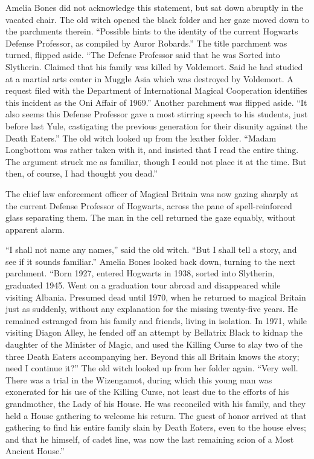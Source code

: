 Amelia Bones did not acknowledge this statement, but sat down abruptly
in the vacated chair. The old witch opened the black folder and her gaze
moved down to the parchments therein. ``Possible hints to the identity
of the current Hogwarts Defense Professor, as compiled by Auror
Robards.'' The title parchment was turned, flipped aside. ``The Defense
Professor said that he was Sorted into Slytherin. Claimed that his
family was killed by Voldemort. Said he had studied at a martial arts
center in Muggle Asia which was destroyed by Voldemort. A request filed
with the Department of International Magical Cooperation identifies this
incident as the Oni Affair of 1969.'' Another parchment was flipped
aside. ``It also seems this Defense Professor gave a most stirring
speech to his students, just before last Yule, castigating the previous
generation for their disunity against the Death Eaters.'' The old witch
looked up from the leather folder. ``Madam Longbottom was rather taken
with it, and insisted that I read the entire thing. The argument struck
me as familiar, though I could not place it at the time. But then, of
course, I had thought you dead.''

The chief law enforcement officer of Magical Britain was now gazing
sharply at the current Defense Professor of Hogwarts, across the pane of
spell-reinforced glass separating them. The man in the cell returned the
gaze equably, without apparent alarm.

``I shall not name any names,'' said the old witch. ``But I shall tell a
story, and see if it sounds familiar.'' Amelia Bones looked back down,
turning to the next parchment. ``Born 1927, entered Hogwarts in 1938,
sorted into Slytherin, graduated 1945. Went on a graduation tour abroad
and disappeared while visiting Albania. Presumed dead until 1970, when
he returned to magical Britain just as suddenly, without any explanation
for the missing twenty-five years. He remained estranged from his family
and friends, living in isolation. In 1971, while visiting Diagon Alley,
he fended off an attempt by Bellatrix Black to kidnap the daughter of
the Minister of Magic, and used the Killing Curse to slay two of the
three Death Eaters accompanying her. Beyond this all Britain knows the
story; need I continue it?'' The old witch looked up from her folder
again. ``Very well. There was a trial in the Wizengamot, during which
this young man was exonerated for his use of the Killing Curse, not
least due to the efforts of his grandmother, the Lady of his House. He
was reconciled with his family, and they held a House gathering to
welcome his return. The guest of honor arrived at that gathering to find
his entire family slain by Death Eaters, even to the house elves; and
that he himself, of cadet line, was now the last remaining scion of a
Most Ancient House.''

